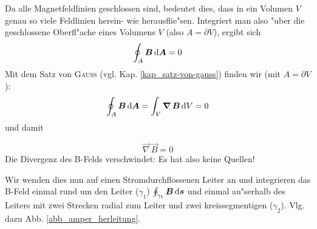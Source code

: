 Da alle Magnetfeldlinien geschlossen sind, bedeutet dies, dass in ein
Volumen $V$ genau so viele Feldlinien herein- wie herausflie"sen.
Integriert man also "uber die geschlossene Oberfl"ache eines Volumens
$V$ (also $A = \partial V$), ergibt sich
\begin{equation}
   \label{eqn_differenz-c94}
   \oint_A \boldsymbol{B} \, \mathrm{d} \boldsymbol{A} = 0
\end{equation}
Mit dem Satz von \textsc{Gauss} (vgl. Kap. \ref{kap_satz-von-gauss})
finden wir (mit $A = \partial V$):
\begin{equation}
   \label{eqn_differenz-c93}
   \oint_A \boldsymbol{B} \, \mathrm{d} \boldsymbol{A} = \int_V \boldsymbol{\nabla} \, \boldsymbol{B} \, \mathrm{d}
    V = 0
\end{equation}
und damit
\begin{Wichtig}
   \begin{equation}
      \label{eqn_differenz-c95}
      \boxed{\vec \nabla \, \vec B = 0}
   \end{equation}
Die Divergenz des B-Felds verschwindet: Es hat also keine Quellen!
\end{Wichtig}


\abs
Wir wenden dies nun auf einen Stromdurchflossenen Leiter an und
integrieren das B-Feld einmal rund um den Leiter ($\gamma_1$)
$\oint_{\gamma_1}\boldsymbol{B}\, \mathrm{d} \boldsymbol{s}$ und einmal
au"serhalb des Leiters mit zwei Strecken radial zum Leiter und zwei
kreissegmentigen ($\gamma_2$). Vlg. dazu
Abb. \ref{abb_amper_herleitung}.

